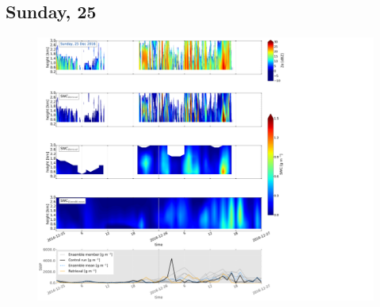 \subsection{Sunday, \SI{25}{\dec}}
\label{sec:vertEM09:2512}
\begin{figure}[t]
	\centering
	\includegraphics[trim={0.4cm .4cm 31.3cm 63.5cm},clip,width=\textwidth]{./fig_SWC/20161225}
	\caption{}\label{fig:SWP25}
\end{figure}
%
